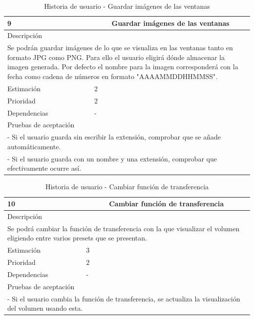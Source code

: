 \begin{table}[H]
	\begin{center}
		\begin{tabular} {|l|c|l|}
			\hline
			9 & \multicolumn{2}{c|}{Guardar imágenes de las ventanas} \\ \hline \hline
			\multicolumn{3}{|l|}{Descripción} \\ \hline
			\multicolumn{3}{|p{12cm}|}{Se podrán guardar imágenes de lo que se visualiza en las ventanas tanto en formato JPG como PNG. Para ello el usuario eligirá dónde almacenar la imagen generada. Por defecto el nombre para la imagen corresponderá con la fecha como cadena de números en formato "AAAAMMDDHHMMSS".} \\ \hline
			\multicolumn{2}{|l|}{Estimación} & 2 \\ \hline
			\multicolumn{2}{|l|}{Prioridad} & 2 \\ \hline
			\multicolumn{2}{|l|}{Dependencias} & - \\ \hline
			\multicolumn{3}{|l|}{Pruebas de aceptación} \\ \hline
			\multicolumn{3}{|p{12cm}|}{ - Si el usuario guarda sin escribir la extensión, comprobar que se añade automáticamente.} \\
			\multicolumn{3}{|p{12cm}|}{ - Si el usuario guarda con un nombre y una extensión, comprobar que efectivamente ocurre así.} \\ \hline
		\end{tabular}
	\end{center}
	\caption{Historia de usuario - Guardar imágenes de las ventanas}
	\label{tab:hu_guardar_imagenes_de_las_ventanas}
\end{table}

\begin{table}[H]
	\begin{center}
		\begin{tabular} {|l|c|l|}
			\hline
			10 & \multicolumn{2}{c|}{Cambiar función de transferencia} \\ \hline \hline
			\multicolumn{3}{|l|}{Descripción} \\ \hline
			\multicolumn{3}{|p{12cm}|}{Se podrá cambiar la función de transferencia con la que visualizar el volumen eligiendo entre varios presets que se presentan.} \\ \hline
			\multicolumn{2}{|l|}{Estimación} & 3 \\ \hline
			\multicolumn{2}{|l|}{Prioridad} & 2 \\ \hline
			\multicolumn{2}{|l|}{Dependencias} & - \\ \hline
			\multicolumn{3}{|l|}{Pruebas de aceptación} \\ \hline
			\multicolumn{3}{|p{12cm}|}{ - Si el usuario cambia la función de transferencia, se actualiza la visualización del volumen usando esta.} \\ \hline
		\end{tabular}
	\end{center}
	\caption{Historia de usuario - Cambiar función de transferencia}
	\label{tab:hu_cambiar_funcion_de_transferencia}
\end{table}


